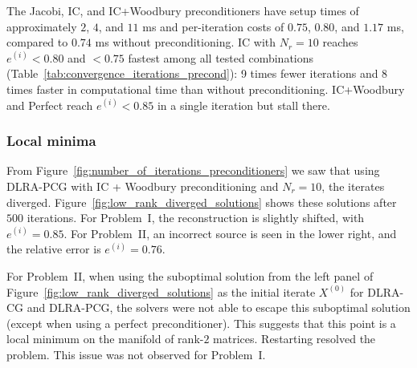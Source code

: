 The Jacobi, IC, and IC+Woodbury preconditioners have setup times of approximately $2$, $4$, and $11$ ms and per-iteration costs of $0.75$, $0.80$, and $1.17$ ms, compared to $0.74$ ms without preconditioning. IC with $N_r = 10$ reaches $e^{(i)} < 0.80$ and $< 0.75$ fastest among all tested combinations (Table~\ref{tab:convergence_iterations_precond}): 9 times fewer iterations and 8 times faster in computational time than without preconditioning. IC+Woodbury and Perfect reach $e^{(i)} < 0.85$ in a single iteration but stall there.


\subsubsection{Local minima}\label{sec:local_minima}

From Figure~\ref{fig:number_of_iterations_preconditioners} we saw that using DLRA-PCG with IC + Woodbury preconditioning and $N_r = 10$, the iterates diverged. Figure~\ref{fig:low_rank_diverged_solutions} shows these solutions after $500$ iterations. For Problem~I, the reconstruction is slightly shifted, with $e^{(i)} = 0.85$. For Problem~II, an incorrect source is seen in the lower right, and the relative error is $e^{(i)} = 0.76$.

For Problem~II, when using the suboptimal solution from the left panel of Figure~\ref{fig:low_rank_diverged_solutions} as the initial iterate $X^{(0)}$ for DLRA-CG and DLRA-PCG, the solvers were not able to escape this suboptimal solution (except when using a perfect preconditioner). This suggests that this point is a local minimum on the manifold of rank-$2$ matrices. Restarting resolved the problem. This issue was not observed for Problem~I. 
